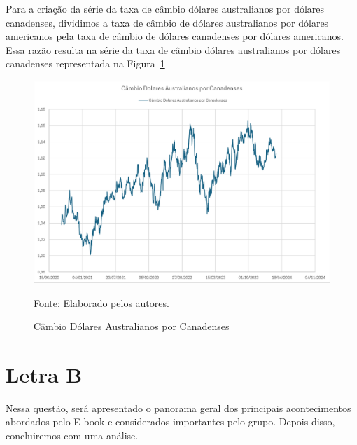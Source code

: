 \documentclass[a4paper,12pt]{article}[abntex2]
\begin{document}
Para a criação da série da taxa de câmbio dólares australianos por dólares canadenses, dividimos a taxa de câmbio de dólares australianos por dólares americanos pela taxa de câmbio de dólares canadenses por dólares americanos. Essa razão resulta na série da taxa de câmbio dólares australianos por dólares canadenses representada na Figura~\ref{fig:Câmbio Dólares Australianos por Canadenses} 

\begin{figure}[H]
    \centering
    \caption{Câmbio Dólares Australianos por Canadenses} 
    \includegraphics[width=1.0\textwidth]{Câmbio Dólares Australianos por Canadenses.png}
    \label{fig:Câmbio Dólares Australianos por Canadenses}
    
    \footnotesize{Fonte: Elaborado pelos autores.}
    \end{figure}

\section{\textbf{Letra B}}
Nessa questão, será apresentado o panorama geral dos principais acontecimentos abordados pelo E-book e considerados importantes pelo grupo. Depois disso, concluiremos com uma análise.
\end{document}

